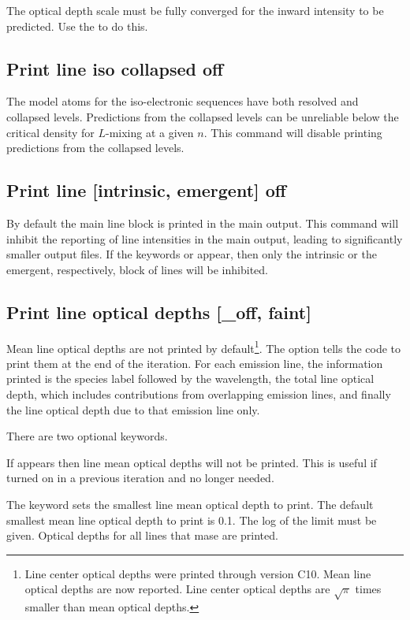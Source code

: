 The optical depth scale must be fully converged for the inward
intensity to be predicted.
Use the  to do this.

\subsection{Print line iso collapsed off}
\label{sec:CommandPrintLineIsoCollapsed}

The model atoms for the iso-electronic sequences have both resolved and
collapsed levels.
Predictions from the collapsed levels can be unreliable 
below the critical density for $L$-mixing at a given $n$.
This command will disable printing predictions from the collapsed
levels.

\subsection{Print line [intrinsic, emergent] off}

By default the main line block is printed in the main output.
This command will inhibit the reporting of line intensities in
the main output, leading to significantly smaller output files.
If the keywords  or 
appear, then only the intrinsic or the emergent, respectively,
block of lines will be inhibited.

\subsection{Print line optical depths [\_off, faint]}

Mean line optical depths are not printed by default\footnote{Line center optical
depths were printed through version C10.  Mean line optical depths
are now reported.  Line center optical depths are 
$\sqrt{ \pi}$  times smaller than mean optical depths.}.
The option tells the
code to print them at the end of the iteration.
For each emission line, the information printed is the species
label followed by the wavelength, the total line optical depth,
which includes contributions from overlapping emission lines,
and finally the line optical depth due to that emission line
only.

There are two optional
keywords.

If  appears then line mean optical depths will not be printed.  This is
useful if turned on in a previous iteration and no longer needed.

The keyword  sets the smallest line mean optical depth to print.
The
default smallest mean line optical depth to print is 0.1.
The log of the limit
must be given.
Optical depths for all lines that mase are printed.


